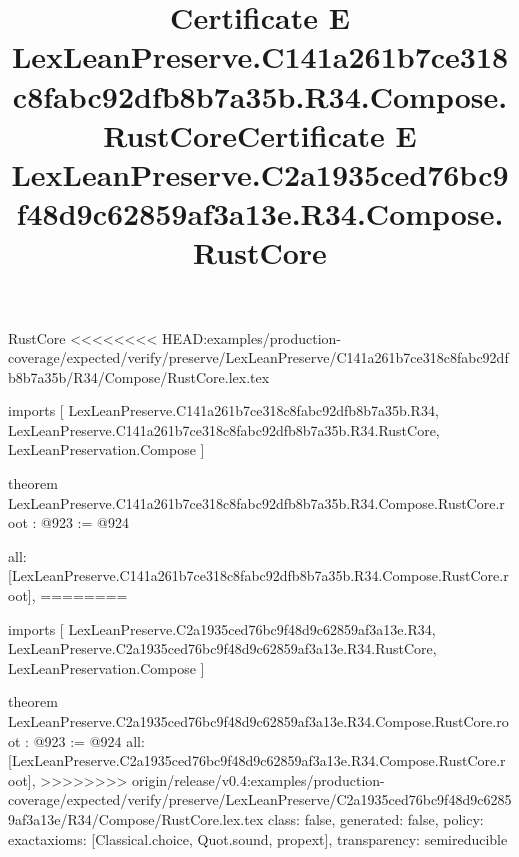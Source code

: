 \begin{lexlean}{RustCore}
<<<<<<<< HEAD:examples/production-coverage/expected/verify/preserve/LexLeanPreserve/C141a261b7ce318c8fabc92dfb8b7a35b/R34/Compose/RustCore.lex.tex
\title{Certificate E LexLeanPreserve.C141a261b7ce318c8fabc92dfb8b7a35b.R34.Compose.RustCore}
\begin{coremodule}
imports [
  LexLeanPreserve.C141a261b7ce318c8fabc92dfb8b7a35b.R34,
  LexLeanPreserve.C141a261b7ce318c8fabc92dfb8b7a35b.R34.RustCore,
  LexLeanPreservation.Compose
]

theorem LexLeanPreserve.C141a261b7ce318c8fabc92dfb8b7a35b.R34.Compose.RustCore.root : @923 := @924 {
  all: [LexLeanPreserve.C141a261b7ce318c8fabc92dfb8b7a35b.R34.Compose.RustCore.root],
========
\title{Certificate E LexLeanPreserve.C2a1935ced76bc9f48d9c62859af3a13e.R34.Compose.RustCore}
\begin{coremodule}
imports [
  LexLeanPreserve.C2a1935ced76bc9f48d9c62859af3a13e.R34,
  LexLeanPreserve.C2a1935ced76bc9f48d9c62859af3a13e.R34.RustCore,
  LexLeanPreservation.Compose
]

theorem LexLeanPreserve.C2a1935ced76bc9f48d9c62859af3a13e.R34.Compose.RustCore.root : @923 := @924 {
  all: [LexLeanPreserve.C2a1935ced76bc9f48d9c62859af3a13e.R34.Compose.RustCore.root],
>>>>>>>> origin/release/v0.4:examples/production-coverage/expected/verify/preserve/LexLeanPreserve/C2a1935ced76bc9f48d9c62859af3a13e/R34/Compose/RustCore.lex.tex
  class: false,
  generated: false,
  policy: exact{axioms: [Classical.choice, Quot.sound, propext]},
  transparency: semireducible
}


\end{coremodule}}
\end{coremodule}
\end{lexlean}
